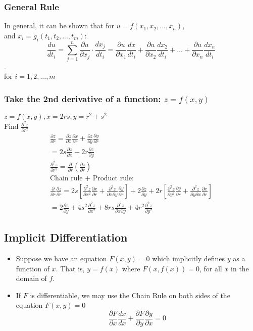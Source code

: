 \documentclass[12pt]{article}
\begin{document}
\subsubsection{General Rule}
In general, it can be shown that for \(u=f(x_1,x_2,...,x_n)\), \\%
and \(x_i = g_i(t_1,t_2,...,t_m)\):
\[
	\frac{du}{dt_i} = \sum_{j=1}^{n} \frac{\partial u}{\partial x_j} \cdot \frac{dx_j}{dt_i} = \frac{\partial u}{\partial x_1} \frac{dx}{dt_i} + \frac{\partial u}{\partial x_2}\frac{dx_2}{dt_i} + \hdots + \frac{\partial u}{\partial x_n} \frac{dx_n}{dt_i} 
\].\\
for \(i=1,2,...,m\)

\subsubsection{Take the 2nd derivative of a function: \(z=f(x,y)\)}
\(z=f(x,y), x = 2rs, y = r^2 + s^2\)\\
Find \(\frac{\partial ^2 z}{\partial r^2} \)
\begin{align}
	\frac{\partial z}{\partial r} =\frac{\partial z}{\partial x} \frac{\partial x}{\partial r}  + \frac{\partial z}{\partial y} \frac{\partial y}{\partial r} \\
	= 2s \frac{\partial z}{\partial x}  + 2r \frac{\partial z}{\partial y} \\
	\frac{\partial ^2z}{\partial r^2} = \frac{\partial }{\partial r} (\frac{\partial z}{\partial r} )\\
	\nonumber \text{Chain rule + Product rule:}\\
	\frac{\partial }{\partial r} \frac{\partial z}{\partial r} = 2s[\frac{\partial ^2z}{\partial x^2} \frac{\partial x}{\partial r} + \frac{\partial ^2z}{\partial x \partial y}\frac{\partial y}{\partial r}  ] + 2 \frac{\partial z}{\partial y} + 2r[\frac{\partial ^2z}{\partial y^2} \frac{\partial y}{\partial r} + \frac{\partial ^2z}{\partial y \partial x} \frac{\partial x}{\partial r} ]\\
	= 2 \frac{\partial z}{\partial y} + 4s^2 \frac{\partial ^2z}{\partial x^2} + 8rs \frac{\partial ^2z}{\partial x \partial y} + 4r^2 \frac{\partial ^2z}{\partial y^2} 
\end{align}

\subsection{Implicit Differentiation}
\begin{itemize}
	\item Suppose we have an equation \(F(x,y) = 0\) which implicitly defines \(y\) as a function of \(x\). That is, \(y=f(x)\) where \(F(x,f(x)) = 0\), for all \(x\) in the domain of \(f\).
	\item If \(F\) is differentiable, we may use the Chain Rule on both sides of the equation \(F(x,y) = 0\)
		\[
			\frac{\partial F}{\partial x} \frac{dx}{dx} + \frac{\partial F}{\partial y} \frac{\partial y}{\partial x} = 0
		\]
\end{itemize}
\end{document}
